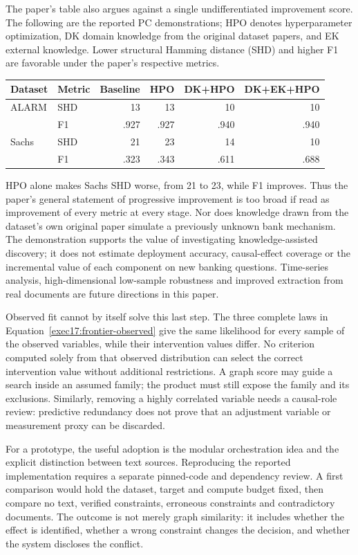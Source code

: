 The paper's table also argues against a single undifferentiated improvement
score. The following are the reported PC demonstrations; HPO denotes
hyperparameter optimization, DK domain knowledge from the original dataset
papers, and EK external knowledge. Lower structural Hamming distance (SHD)
and higher F1 are favorable under the paper's respective metrics.
\citep{exec17_frontier_yang}

\begin{center}
\begin{tabular}{llrrrr}
\toprule
Dataset & Metric & Baseline & HPO & DK+HPO & DK+EK+HPO\\
\midrule
ALARM & SHD &13&13&10&10\\
      & F1  &.927&.927&.940&.940\\
Sachs & SHD &21&23&14&10\\
      & F1  &.323&.343&.611&.688\\
\bottomrule
\end{tabular}
\end{center}

HPO alone makes Sachs SHD worse, from 21 to 23, while F1 improves. Thus
the paper's general statement of progressive improvement is too broad if
read as improvement of every metric at every stage. Nor does knowledge
drawn from the dataset's own original paper simulate a previously unknown
bank mechanism. The demonstration supports the value of investigating
knowledge-assisted discovery; it does not estimate deployment accuracy,
causal-effect coverage or the incremental value of each component on new
banking questions. Time-series analysis, high-dimensional low-sample
robustness and improved extraction from real documents are future directions
in this paper.~\citep{exec17_frontier_yang}

Observed fit cannot by itself solve this last step. The three complete laws
in Equation~\ref{exec17:frontier-observed} give the same likelihood for every
sample of the observed variables, while their intervention values differ.
No criterion computed solely from that observed distribution can select the
correct intervention value without additional restrictions. A graph score
may guide a search inside an assumed family; the product must still expose
the family and its exclusions. Similarly, removing a highly correlated
variable needs a causal-role review: predictive redundancy does not prove
that an adjustment variable or measurement proxy can be discarded.
\citep{exec17_frontier_exact}

For a prototype, the useful adoption is the modular orchestration idea and
the explicit distinction between text sources. Reproducing the reported
implementation requires a separate pinned-code and dependency review.
A first comparison would hold the dataset, target and compute budget fixed,
then compare no text, verified constraints, erroneous constraints and
contradictory documents. The outcome is not merely graph similarity: it
includes whether the effect is identified, whether a wrong constraint
changes the decision, and whether the system discloses the conflict.


